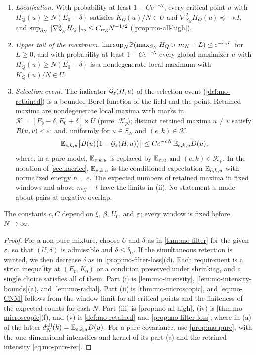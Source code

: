 \begin{corollary}
\begin{enumerate}
\begin{equation}
\end{equation}
\item[(iii)] \emph{Localization.} With probability at least $1-Ce^{-cN}$, every critical point $u$ with $H_Q(u)\ge N(E_0-\delta)$ satisfies $K_Q(u)/N\in U$ and $\nabla_{S_N}^2H_Q(u)\preceq-\kappa I$, and $\sup_{S_N}\|\nabla_{S_N}^3H_Q\|_{\rm op}\le C_{\rm reg}N^{-1/2}$ (\cref{prop:mo-all-high}).
\item[(iv)] \emph{Upper tail of the maximum.} $\limsup_N\mathbb P(\max_{S_N}H_Q>m_N+L)\le e^{-c_0L}$ for $L\ge0$, and with probability at least $1-Ce^{-cN}$ every global maximizer $u$ with $H_Q(u)\ge N(E_0-\delta)$ is a nondegenerate local maximum with $K_Q(u)/N\in U$.
\item[(v)] \emph{Selection event.} The indicator $\mathcal G_\varepsilon(H,u)$ of the selection event (\cref{def:mo-retained}) is a bounded Borel function of the field and the point. Retained maxima are nondegenerate local maxima with marks in $\mathcal K=[E_0-\delta,E_0+\delta]\times\overline U$ (pure: $\mathcal K_p$); distinct retained maxima $u\ne v$ satisfy $R(u,v)<\varepsilon$; and, uniformly for $u\in S_N$ and $(e,k)\in\mathcal K$,
\[
\mathbb E_{e,k,u}\bigl[D(u)\bigl(1-\mathcal G_\varepsilon(H,u)\bigr)\bigr]\le Ce^{-cN}\,\mathbb E_{e,k,u}D(u),
\]
where, in a pure model, $\mathbb E_{e,k,u}$ is replaced by $\mathbb E_{e,u}$ and $(e,k)\in\mathcal K_p$. In the notation of \cref{sec:kacrice}, $\mathbb E_{e,k,u}$ is the conditioned expectation $\mathbb E_{h,k,u}$ with normalized energy $h=e$.
The expected numbers of retained maxima in fixed windows and above $m_N+t$ have the limits in (ii). No statement is made about pairs at negative overlap.
\end{enumerate}
The constants $c,C$ depend on $\xi$, $\beta$, $U_0$, and $\varepsilon$; every window is fixed before $N\to\infty$.
\end{corollary}

\begin{proof}
For a non-pure mixture, choose $U$ and $\delta$ as in \cref{thm:mo-filter} for the given $\varepsilon$, so that $(U,\delta)$ is admissible and $\delta\le\delta_U$. If the simultaneous retention is wanted, we then decrease $\delta$ as in \cref{prop:mo-filter-loss}(d). Each requirement is a strict inequality at $(E_0,K_0)$ or a condition preserved under shrinking, and a single choice satisfies all of them. Part (i) is \cref{lem:mo-intensity}, \cref{lem:mo-intensity-bounds}(a), and \cref{lem:mo-radial}. Part (ii) is \cref{thm:mo-microscopic}, and \eqref{eq:mo-CNM} follows from the window limit for all critical points and the finiteness of the expected counts for each $N$. Part (iii) is \cref{prop:mo-all-high}, (iv) is \cref{thm:mo-microscopic}(f), and (v) is \cref{def:mo-retained} and \cref{prop:mo-filter-loss}, where in (a) of the latter $d_N^{\rm all}(k)=\mathbb E_{e,k,u}D(u)$. For a pure covariance, use \cref{prop:mo-pure}, with the one-dimensional intensities and kernel of its part (a) and the retained intensity \eqref{eq:mo-pure-ret}.
\end{proof}

